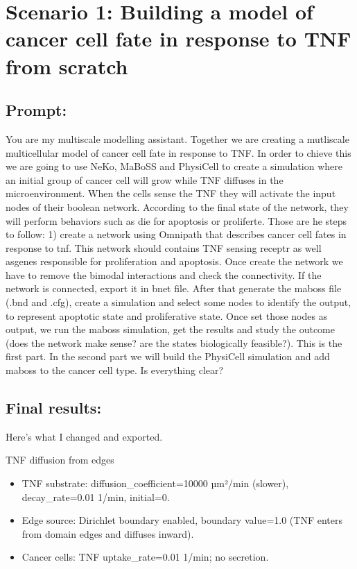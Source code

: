 \hypertarget{scenario-1-building-a-model-of-cancer-cell-fate-in-response-to-tnf-from-scratch}{%
\section{Scenario 1: Building a model of cancer cell fate in response to
TNF from
scratch}\label{scenario-1-building-a-model-of-cancer-cell-fate-in-response-to-tnf-from-scratch}}

\hypertarget{prompt}{%
\subsection{Prompt:}\label{prompt}}

You are my multiscale modelling assistant. Together we are creating a
mutliscale multicellular model of cancer cell fate in response to TNF.
In order to chieve this we are going to use NeKo, MaBoSS and PhysiCell
to create a simulation where an initial group of cancer cell will grow
while TNF diffuses in the microenvironment. When the cells sense the TNF
they will activate the input nodes of their boolean network. According
to the final state of the network, they will perform behaviors such as
die for apoptosis or proliferte. Those are he steps to follow: 1) create
a network using Omnipath that describes cancer cell fates in response to
tnf. This network should contains TNF sensing receptr as well asgenes
responsible for proliferation and apoptosis. Once create the network we
have to remove the bimodal interactions and check the connectivity. If
the network is connected, export it in bnet file. After that generate
the maboss file (.bnd and .cfg), create a simulation and select some
nodes to identify the output, to represent apoptotic state and
proliferative state. Once set those nodes as output, we run the maboss
simulation, get the results and study the outcome (does the network make
sense? are the states biologically feasible?). This is the first part.
In the second part we will build the PhysiCell simulation and add maboss
to the cancer cell type. Is everything clear?

\hypertarget{final-results}{%
\subsection{Final results:}\label{final-results}}

Here's what I changed and exported.

TNF diffusion from edges

\begin{itemize}
\tightlist
\item
  TNF substrate: diffusion\_coefficient=10000 µm²/min (slower),
  decay\_rate=0.01 1/min, initial=0.
\item
  Edge source: Dirichlet boundary enabled, boundary value=1.0 (TNF
  enters from domain edges and diffuses inward).
\item
  Cancer cells: TNF uptake\_rate=0.01 1/min; no secretion.
\end{itemize}

